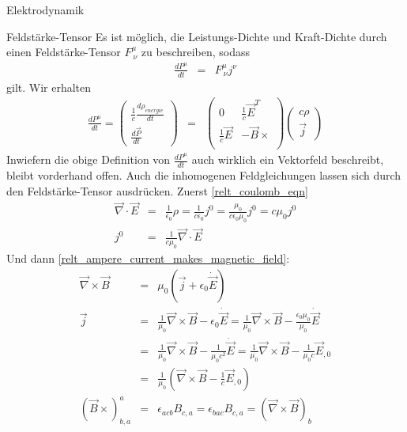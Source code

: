 \begin{chapter}{\titlestr}
\begin{section}{Elektrodynamik}
\begin{subsection}{Feldstärke-Tensor}
\label{field_tensor}
Es ist möglich, die Leistungs-Dichte und Kraft-Dichte durch einen Feldstärke-Tensor $F^\mu_{\ \nu}$ zu beschreiben, sodass
\begin{eqnarray}
\label{covariant_lorentz_force}
\frac{dP^\mu}{dt} &=& F^\mu_{\ \nu}j^\nu
\end{eqnarray}
gilt. Wir erhalten
\begin{eqnarray*}
\frac{dP^\mu}{dt} = 
\begin{pmatrix}
\frac{1}{c}\frac{d\rho_{energie}}{dt}\\
\frac{d\vec{P}}{dt}
\end{pmatrix}
&=&
\begin{pmatrix}
0 &\frac{1}{c}\vec{E}^T\\
\frac{1}{c}\vec{E} &-\vec{B}\times\\
\end{pmatrix}
\begin{pmatrix}
c\rho\\
\vec{j}
\end{pmatrix}
\end{eqnarray*}
Inwiefern die obige Definition von $\frac{dP^\mu}{dt}$ auch wirklich ein Vektorfeld beschreibt, bleibt vorderhand offen.
Auch die inhomogenen Feldgleichungen lassen sich durch den Feldstärke-Tensor ausdrücken. Zuerst \ref{relt_coulomb_eqn}
\begin{eqnarray*}
\vec{\nabla}\cdot\vec{E} &=& \frac{1}{\epsilon_0}\rho = \frac{1}{c\epsilon_0}j^0= \frac{\mu_0}{c\epsilon_0\mu_0}j^0 = c\mu_0j^0\\
j^0 &=& \frac{1}{c\mu_0}\vec{\nabla}\cdot\vec{E}
\end{eqnarray*}
Und dann \ref{relt_ampere_current_makes_magnetic_field}:
\begin{eqnarray*}
\vec{\nabla}\times\vec{B} &=& \mu_0\left(\vec{j}+\epsilon_0\dot{\vec{E}}\right)\\
\vec{j} &=& \frac{1}{\mu_0}\vec{\nabla}\times\vec{B}-\epsilon_0\dot{\vec{E}}
=\frac{1}{\mu_0}\vec{\nabla}\times\vec{B}-\frac{\epsilon_0\mu_0}{\mu_0}\dot{\vec{E}}\\
&=&\frac{1}{\mu_0}\vec{\nabla}\times\vec{B}-\frac{1}{\mu_0c^2}\dot{\vec{E}}
=\frac{1}{\mu_0}\vec{\nabla}\times\vec{B}-\frac{1}{\mu_0c}\vec{E}_{,0}\\
&=&\frac{1}{\mu_0}\left(\vec{\nabla}\times\vec{B}-\frac{1}{c}\vec{E}_{,0}\right)\\
\left(\vec{B}\times\right)^a_{b,a} &=& \epsilon_{acb}B_{c,a}=\epsilon_{bac}B_{c,a}=\left(\vec{\nabla}\times \vec{B}\right)_b\\

\end{eqnarray*}
\end{subsection}
\end{section}
\end{chapter}
